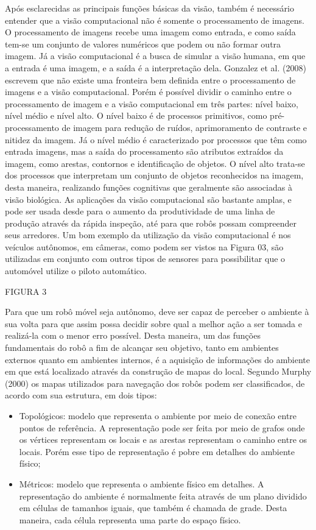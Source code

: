 Após esclarecidas as principais funções básicas da visão, também é necessário entender que a visão computacional não é somente o processamento de imagens. O processamento de imagens recebe uma imagem como entrada, e como saída tem-se um conjunto de valores numéricos que podem ou não formar outra imagem. Já a visão computacional é a busca de simular a visão humana, em que a entrada é uma imagem, e a saída é a interpretação dela. 
Gonzalez et al. (2008) escrevem que não existe uma fronteira bem definida entre o processamento de imagens e a visão computacional. Porém é possível dividir o caminho entre o processamento de imagem e a visão computacional em três partes: nível baixo, nível médio e nível alto. O nível baixo é de processos primitivos, como pré-processamento de imagem para redução de ruídos, aprimoramento de contraste e nitidez da imagem. Já o nível médio é caracterizado por processos que têm como entrada imagens, mas a saída do processamento são atributos extraídos da imagem, como arestas, contornos e identificação de objetos. O nível alto trata-se dos processos que interpretam um conjunto de objetos reconhecidos na imagem, desta maneira, realizando funções cognitivas que geralmente são associadas à visão biológica.
As aplicações da visão computacional são bastante amplas, e pode ser usada desde para o aumento da produtividade de uma linha de produção através da rápida inspeção, até para que robôs possam compreender seus arredores. Um bom exemplo da utilização da visão computacional é nos veículos autônomos, em câmeras, como podem ser vistos na Figura 03, são utilizadas em conjunto com outros tipos de sensores para possibilitar que o automóvel utilize o piloto automático. 

FIGURA 3

Para que um robô móvel seja autônomo, deve ser capaz de perceber o ambiente à sua volta para que assim possa decidir sobre qual a melhor ação a ser tomada e realizá-la com o menor erro possível. Desta maneira, um das funções fundamentais do robô a fim de alcançar seu objetivo, tanto em ambientes externos quanto em ambientes internos, é a aquisição de informações do ambiente em que está localizado através da construção de mapas do local. Segundo Murphy (2000) os mapas utilizados para navegação dos robôs podem ser classificados, de acordo com sua estrutura, em dois tipos:

\begin{itemize}
	\item Topológicos: modelo que representa o ambiente por meio de conexão entre pontos de referência. A representação pode ser feita por meio de grafos onde os vértices representam os locais e as arestas representam o caminho entre os locais. Porém esse tipo de representação é pobre em detalhes do ambiente físico;
	
	\item Métricos: modelo que representa o ambiente físico em detalhes. A representação do ambiente é normalmente feita através de um plano dividido em células de tamanhos iguais, que também é chamada de grade. Desta maneira, cada célula representa uma parte do espaço físico.
\end{itemize}

